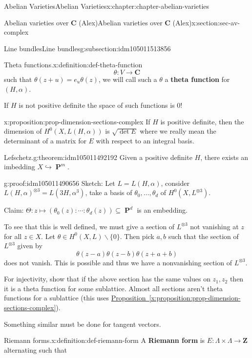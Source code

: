 \documentclass[oneside,10pt,]{book}
\newcommand{\terminology}[1]{\textbf{#1}}
\numberwithin{equation}{section}
\newcommand{\ZZ}{\mathbf{Z}}
\newcommand{\CC}{\mathbf{C}}
\DeclareMathOperator{\PP}{\mathbf{P}}
\begin{document}
\begin{chapterptx}{Abelian Varieties}{}{Abelian Varieties}{}{}{x:chapter:chapter-abelian-varieties}
\begin{sectionptx}{Abelian varieties over \(\CC\) (Alex)}{}{Abelian varieties over \(\CC\) (Alex)}{}{}{x:section:sec-av-complex}
\begin{subsectionptx}{Line bundles}{}{Line bundles}{}{}{g:subsection:idm105011513856}
\begin{definition}{Theta functions.}{x:definition:def-theta-function}
\begin{equation*}
\theta \colon V \to \CC
\end{equation*}
such that \(\theta(z+ u) = e_u \theta(z)\), we will call such a \(\theta\) a \terminology{theta function} for \((H,\alpha)\).%
\end{definition}
If \(H\) is not positive definite the space of such functions is 0!%
\begin{proposition}{}{}{x:proposition:prop-dimension-sections-complex}%
If \(H\) is positive definite, then the dimension of \(H^0(X, L(H,\alpha))\) is \(\sqrt{\det E}\) where we really mean the determinant of a matrix for \(E\) with respect to an integral basis.%
\end{proposition}
\begin{theorem}{Lefschetz.}{}{g:theorem:idm105011492192}%
Given a positive definite \(H\), there exists an imbedding \(X \hookrightarrow \PP^m\).%
\end{theorem}
\begin{proofptx}{}{g:proof:idm105011490656}
Sketch: Let \(L = L(H,\alpha)\), consider \(L(H,\alpha)^{\otimes 3} = L(3H, \alpha^3)\), take a basis of \(\theta_0,\ldots, \theta_d\) of \(H^0(X, L^{\otimes 3})\).%
\par
Claim: \(\Theta\colon z\mapsto (\theta_0(z) :\cdots :\theta_d (z)) \subseteq \PP^d\) is an embedding.%
\par
To see that this is well defined, we must give a section of \(L^{\otimes 3}\) not vanishing at \(z\) for all \(z\in X\). Let \(\theta \in H^0(X,L)\smallsetminus \{0\}\). Then pick \(a,b\) such that the section of \(L^{\otimes 3}\) given by%
\begin{equation*}
\theta(z-a)\theta(z-b) \theta(z+ a+b)
\end{equation*}
does not vanish. This is possible and thus we have a nonvanishing section of \(L^{\otimes 3}\).%
\par
For injectivity, show that if the above section has the same values on \(z_1,z_2\) then it is a theta function for some sublattice. Almost all sections aren't theta functions for a sublattice (this uses \hyperref[x:proposition:prop-dimension-sections-complex]{Proposition~\ref{x:proposition:prop-dimension-sections-complex}}).%
\par
Something similar must be done for tangent vectors.%
\end{proofptx}
\begin{definition}{Riemann forms.}{x:definition:def-riemann-form}%
A \terminology{Riemann form} is \(E\colon \Lambda \times \Lambda \to \ZZ\) alternating such that%

\end{definition}
\end{subsectionptx}
\end{sectionptx}
\end{chapterptx}
\end{document}
